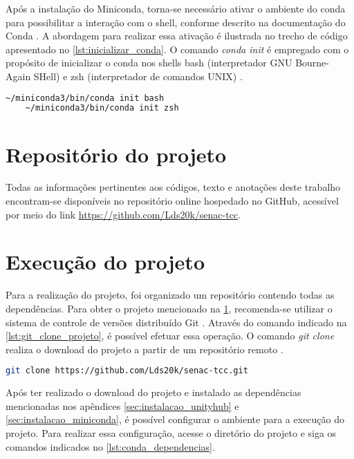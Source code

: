 Após a instalação do Miniconda, torna-se necessário ativar o ambiente do conda para possibilitar a interação com o shell, conforme descrito na documentação do Conda \cite{conda_documentation}. A abordagem para realizar essa ativação é ilustrada no trecho de código apresentado no \cref{lst:inicializar_conda}. O comando \emph{conda init} é empregado com o propósito de inicializar o conda nos shells bash (interpretador GNU Bourne-Again SHell) e zsh (interpretador de comandos UNIX) \cite{debian_man_pages,conda_documentation}.

\begin{lstlisting}[caption={Trecho de código com comando para inicializar o Miniconda \cite{miniconda_documentation}},label={lst:inicializar_conda},language=Bash,showstringspaces=false]
    ~/miniconda3/bin/conda init bash
    ~/miniconda3/bin/conda init zsh
\end{lstlisting}

\section{Repositório do projeto}
\label{sec:repositorio_projeto}

Todas as informações pertinentes aos códigos, texto e anotações deste trabalho encontram-se disponíveis no repositório online hospedado no GitHub, acessível por meio do link \url{https://github.com/Lds20k/senac-tcc}.

\section{Execução do projeto}

Para a realização do projeto, foi organizado um repositório contendo todas as dependências. Para obter o projeto mencionado na \cref{sec:repositorio_projeto}, recomenda-se utilizar o sistema de controle de versões distribuído Git \cite{git_page}. Através do comando indicado na \cref{lst:git_clone_projeto}, é possível efetuar essa operação. O comando \emph{git clone} realiza o download do projeto a partir de um repositório remoto \cite{git_clone}.

\begin{lstlisting}[caption={Trecho de código com comando do git para baixar o projeto},label={lst:git_clone_projeto},language=Bash,showstringspaces=false]
    git clone https://github.com/Lds20k/senac-tcc.git
\end{lstlisting}

Após ter realizado o download do projeto e instalado as dependências mencionadas nos apêndices \ref{sec:instalacao_unityhub} e \ref{sec:instalacao_miniconda}, é possível configurar o ambiente para a execução do projeto. Para realizar essa configuração, acesse o diretório do projeto e siga os comandos indicados no \cref{lst:conda_dependencias}.

